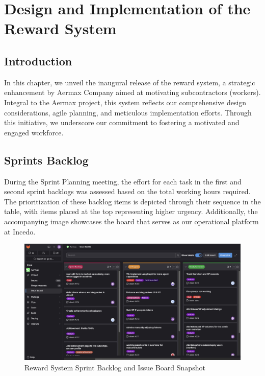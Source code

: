 \chapter{Design and Implementation of the Reward System}
\minitoc
\newpage

\setcounter{secnumdepth}{0} %
\section{Introduction}

In this chapter, we unveil the inaugural release of the reward system, a strategic enhancement by Aermax Company aimed at motivating subcontractors (workers). Integral to the Aermax project, this system reflects our comprehensive design considerations, agile planning, and meticulous implementation efforts. Through this initiative, we underscore our commitment to fostering a motivated and engaged workforce.

\section{Sprints Backlog}
During the Sprint Planning meeting, the effort for each task in the first and second sprint backlogs was assessed based on the total working hours required. The prioritization of these backlog items is depicted through their sequence in the table, with items placed at the top representing higher urgency. Additionally, the accompanying image showcases the board that serves as our operational platform at Incedo.

 \begin{figure}[H]
    \centering
    \includegraphics[width=1\textwidth]{src/assets/chapters/reward-system-backloog.png}
    \caption{Reward System Sprint Backlog and Issue Board Snapshot}
    \label{fig:sprint_backlog_and_issue_board}
\end{figure}

